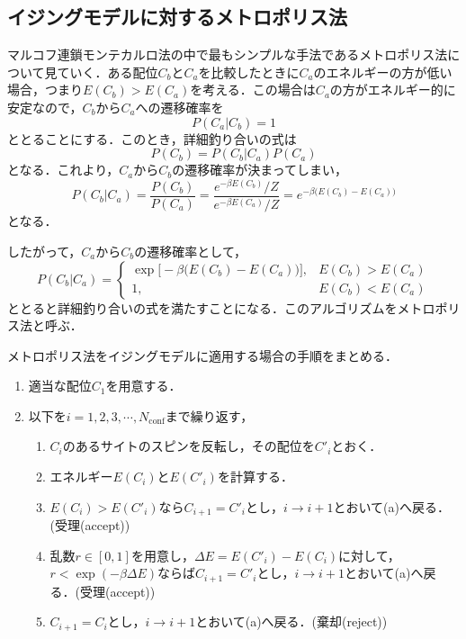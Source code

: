 \documentclass[a4paper,11pt]{jsarticle}
\begin{document}
\subsection*{イジングモデルに対するメトロポリス法}
マルコフ連鎖モンテカルロ法の中で最もシンプルな手法であるメトロポリス法について見ていく．ある配位$C_b$と$C_a$を比較したときに$C_a$のエネルギーの方が低い場合，つまり$E(C_b)>E(C_a)$を考える．この場合は$C_a$の方がエネルギー的に安定なので，$C_b$から$C_a$への遷移確率を
\begin{equation}
  P(C_a|C_b) = 1
\end{equation}
ととることにする．このとき，詳細釣り合いの式は
\begin{equation}
  P(C_b) = P(C_b|C_a)P(C_a)
\end{equation}
となる．これより，$C_a$から$C_b$の遷移確率が決まってしまい，
\begin{equation}
  P(C_b|C_a) = \frac{P(C_b)}{P(C_a)} = \frac{e^{-\beta E(C_b)}/Z}{e^{-\beta E(C_a)}/Z} = e^{ -\beta\Big( E(C_b)-E(C_a) \Big)}
\end{equation}
となる．\par
したがって，$C_a$から$C_b$の遷移確率として，
\begin{equation}
  P(C_b|C_a)=
  \begin{cases}
    \exp\Big[ -\beta\Big( E(C_b)-E(C_a) \Big) \Big], & E(C_b)>E(C_a) \\
    1, & E(C_b)<E(C_a)
  \end{cases}
\end{equation}
ととると詳細釣り合いの式を満たすことになる．このアルゴリズムをメトロポリス法と呼ぶ．\par
メトロポリス法をイジングモデルに適用する場合の手順をまとめる．
\begin{enumerate}
  \item 適当な配位$C_1$を用意する．
  \item 以下を$i = 1,2,3,\cdots,N_{\text{conf}}$まで繰り返す，
  \begin{enumerate}
    \item $C_i$のあるサイトのスピンを反転し，その配位を$C'_i$とおく．
    \item エネルギー$E(C_i)$と$E(C'_i)$を計算する．
    \item $E(C_i)>E(C'_i)$なら$C_{i+1}=C'_i$とし，$i \rightarrow i+1$とおいて(a)へ戻る．(受理(accept))
    \item 乱数$r \in [0,1]$を用意し，$\Delta E = E(C'_i)-E(C_i)$に対して，$r < \exp(-\beta\Delta E)$ならば$C_{i+1}=C'_i$とし，$i \rightarrow i+1$とおいて(a)へ戻る．(受理(accept))
    \item $C_{i+1}=C_i$とし，$i \rightarrow i+1$とおいて(a)へ戻る．(棄却(reject))
  \end{enumerate}
\end{enumerate}
\end{document}
